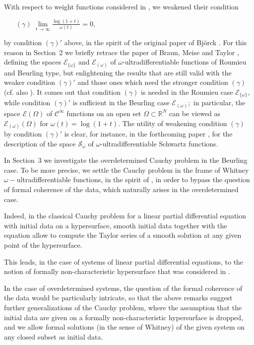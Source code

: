 \documentclass[twoside]{amsart}
\begin{document}
With respect to weight functions considered in \cite{BMT},
we weakened their condition
\begin{itemize}
\item [{$(\gamma)$}] ${\displaystyle 
\underset{t\rightarrow\infty}{\lim}\frac{\log(1+t)}{\omega(t)}=0,}$
\end{itemize}
by condition $(\gamma)'$ above, in the spirit of the original paper
of Bj\"{o}rck \cite{Bj}. For this reason in Section~2 we briefly retrace
the paper of Braun, Meise and Taylor \cite{BMT}, defining the spaces
${\mathcal{E}}_{\{\omega\}}$ and ${\mathcal{E}}_{(\omega)}$ of $\omega$-ultradifferentiable functions 
of Roumieu and Beurling type,
but enlightening the
results that are still valid with the weaker condition $(\gamma)'$
and those ones which need the stronger condition $(\gamma)$ 
(cf. also \cite{Fi,G}).
It comes out that
condition $(\gamma)$ is needed in the Roumieu case ${\mathcal{E}}_{\{\omega\}}$, while
condition $(\gamma)'$ is sufficient in the Beurling case ${\mathcal{E}}_{(\omega)};$
in particular, the space ${\mathcal E}(\Omega)$ of ${\mathcal C}^{\infty}$
functions on an open set $\Omega\subset{\mathbb R}^N$ can be viewed as
${\mathcal{E}}_{(\omega)}(\Omega)$ for $\omega(t)=\log(1+t)$.
The utility of weakening condition $(\gamma)$ by condition $(\gamma)'$ is
clear, for instance, in the forthcoming paper \cite{BJO},  
for the description of the space
${\mathcal{S}}_\omega$ of $\omega$-ultradifferentiable Schwartz functions.

In Section~3 we investigate the overdetermined Cauchy problem in the
Beurling case. To be more precise, we settle the Cauchy problem in
the frame of Whitney $\omega-$ultradifferentiable functions, 
in the spirit of \cite{N2,BN1,BN3}, in order
to bypass the question of formal coherence of the data, which naturally
arises in the overdetermined case.

Indeed, in the classical Cauchy problem for a linear partial differential 
equation with initial data on a hypersurface, smooth initial data together
with the equation allow to compute the Taylor series of a smooth solution
at any given point of the hypersurface.

This leads, in the case of systems of linear partial
differential equations, to the notion of formally
non-characteristic hypersurface that was considered in \cite{AHLM,AN2,N2}.

In the case of overdetermined systems, the question of the formal
coherence of the data would be particularly intricate, so that 
the above remarks suggest further generalizations of the Cauchy problem,
where the assumption that the initial data are given on a formally 
non-characteristic hypersurface is dropped, and we allow
formal solutions (in the sense of Whitney)
of the given system on any closed subset as initial data.
\end{document}
